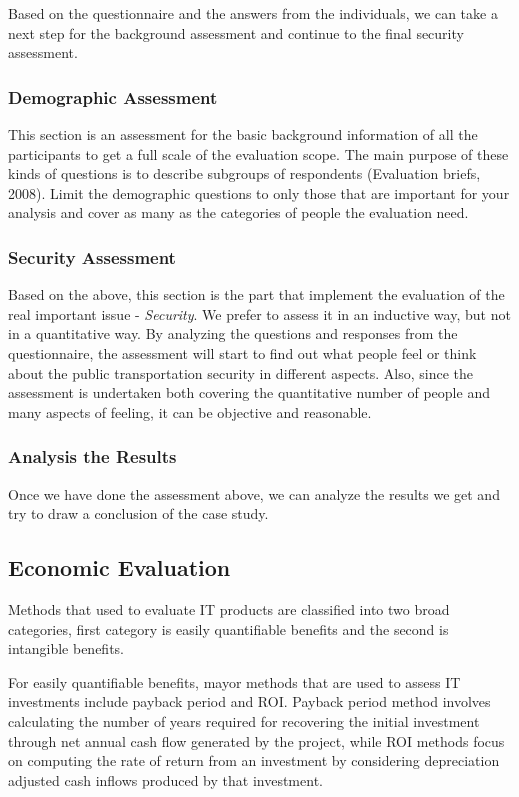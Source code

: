 \documentclass[twocolumn]{article}
\begin{document}
Based on the questionnaire and the answers from the individuals, we can take a next step for the background assessment and continue to the final security assessment.

\subsubsection{Demographic Assessment}
This section is an assessment for the basic background information of all the participants to get a full scale of the evaluation scope. The main purpose of these kinds of questions is to describe subgroups of respondents (Evaluation briefs, 2008). Limit the demographic questions to only those that are important for your analysis and cover as many as the categories of people the evaluation need.

\subsubsection{Security Assessment}
Based on the above, this section is the part that implement the evaluation of the real important issue - \emph{Security}. We prefer to assess it in an inductive way, but not in a quantitative way. By analyzing the questions and responses from the questionnaire, the assessment will start to find out what people feel or think about the public transportation security in different aspects. Also, since the assessment is undertaken both covering the quantitative number of people and many  aspects of feeling, it can be objective and reasonable.

\subsubsection{Analysis the Results}
Once we have done the assessment above, we can analyze the results we get and try to draw a conclusion of the case study.

\subsection{Economic Evaluation}
Methods that used to evaluate IT products are classified into two broad categories, first category is easily quantifiable benefits and the second is intangible benefits.

For easily quantifiable benefits, mayor methods that are used to assess IT investments include payback period and ROI. Payback period method involves calculating the number of years required for recovering the initial investment through net annual cash flow generated by the project, while ROI methods focus on computing the rate of return from an investment by considering depreciation adjusted cash inflows produced by that investment.
\end{document}
